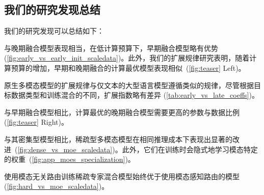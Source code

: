 
\subsection{我们的研究发现总结}
我们的研究发现可以总结如下：

 与晚期融合模型表现相当，在低计算预算下，早期融合模型略有优势 (\cref{fig:early_vs_early_init_scaledata})。此外，我们的扩展规律研究表明，随着计算预算的增加，早期和晚期融合的计算最优模型表现相似~(\cref{fig:teaser} Left)。

 原生多模态模型的扩展规律与仅文本的大型语言模型遵循类似的规律，尽管根据目标数据类型和训练混合的不同，扩展指数略有差异 (\cref{tab:early_vs_late_coeffs})。

 与早期融合模型相比，计算最优的晚期融合模型需要更高的参数与数据比例 (\cref{fig:teaser} Right)。

 与其密集型模型相比，稀疏型多模态模型在相同推理成本下表现出显著的改进~(\cref{fig:dense_vs_moe_scaledata})。此外，它们在训练时会隐式地学习模态特定的权重~(\cref{fig:app_moes_specialization})。 

 使用模态无关路由训练稀疏专家混合模型始终优于使用模态感知路由的模型 (\cref{fig:hard_vs_moe_scaledata})。

\vspace{-5pt}
